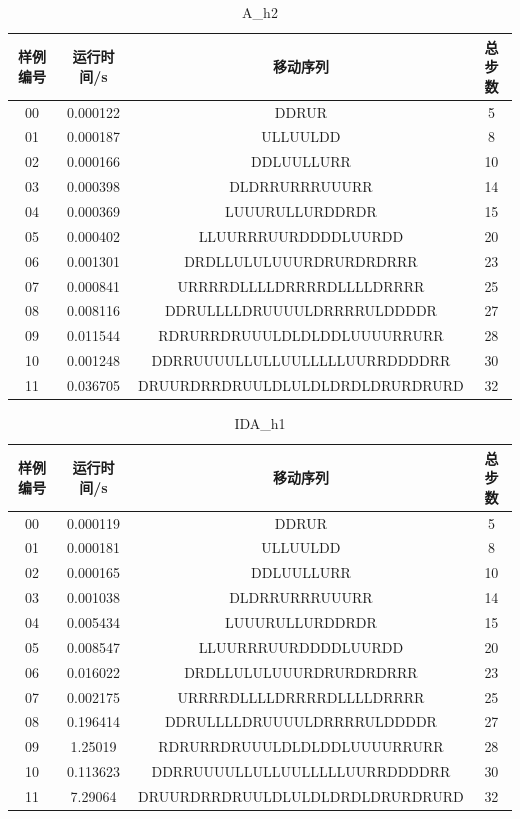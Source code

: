 \documentclass[UTF8]{article}
\begin{document}
    \begin{table}[H]
        \centering
        \caption{A\_h2}
        \begin{tabular}{cccc}
            \hline
            样例编号 & 运行时间/s & 移动序列 & 总步数 \\
            \hline
            00 & 0.000122 & DDRUR & 5  \\
            01 & 0.000187 & ULLUULDD & 8  \\
            02 & 0.000166 & DDLUULLURR & 10  \\
            03 & 0.000398 & DLDRRURRRUUURR & 14  \\
            04 & 0.000369 & LUUURULLURDDRDR & 15  \\
            05 & 0.000402 & LLUURRRUURDDDDLUURDD & 20  \\
            06 & 0.001301 & DRDLLULULUUURDRURDRDRRR & 23  \\
            07 & 0.000841 & URRRRDLLLLDRRRRDLLLLDRRRR & 25  \\
            08 & 0.008116 & DDRULLLLDRUUUULDRRRRULDDDDR & 27  \\
            09 & 0.011544 & RDRURRDRUUULDLDLDDLUUUURRURR & 28  \\
            10 & 0.001248 & DDRRUUUULLULLUULLLLLUURRDDDDRR & 30  \\
            11 & 0.036705 & DRUURDRRDRUULDLULDLDRDLDRURDRURD & 32  \\
            \hline
        \end{tabular}
    \end{table}
    \begin{table}[H]
        \centering
        \caption{IDA\_h1}
        \begin{tabular}{cccc}
            \hline
            样例编号 & 运行时间/s & 移动序列 & 总步数 \\
            \hline
            00 & 0.000119 & DDRUR & 5  \\
            01 & 0.000181 & ULLUULDD & 8  \\
            02 & 0.000165 & DDLUULLURR & 10  \\
            03 & 0.001038 & DLDRRURRRUUURR & 14  \\
            04 & 0.005434 & LUUURULLURDDRDR & 15  \\
            05 & 0.008547 & LLUURRRUURDDDDLUURDD & 20  \\
            06 & 0.016022 & DRDLLULULUUURDRURDRDRRR & 23  \\
            07 & 0.002175 & URRRRDLLLLDRRRRDLLLLDRRRR & 25  \\
            08 & 0.196414 & DDRULLLLDRUUUULDRRRRULDDDDR & 27  \\
            09 & 1.25019 & RDRURRDRUUULDLDLDDLUUUURRURR & 28  \\
            10 & 0.113623 & DDRRUUUULLULLUULLLLLUURRDDDDRR & 30  \\
            11 & 7.29064 & DRUURDRRDRUULDLULDLDRDLDRURDRURD & 32  \\
            \hline
        \end{tabular}
    \end{table}
\end{document}

